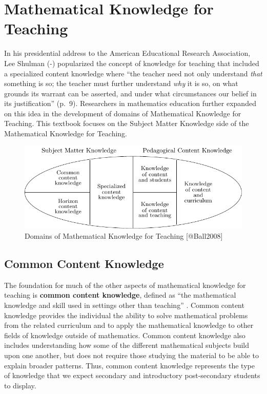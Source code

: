 \documentclass[
]{book}
\theoremstyle{definition}
\theoremstyle{definition}
\theoremstyle{definition}
\theoremstyle{definition}
\theoremstyle{remark}
\begin{document}
\newpage

\hypertarget{MKT}{%
\section{Mathematical Knowledge for Teaching}\label{MKT}}

In his presidential address to the American Educational Research Association, Lee Shulman (-\citet{shulman1986}) popularized the concept of knowledge for teaching that included a specialized content knowledge where ``the teacher need not only understand \emph{that} something is so; the teacher must further understand \emph{why} it is so, on what grounds its warrant can be asserted, and under what circumstances our belief in its justification'' (p.~9). Researchers in mathematics education further expanded on this idea in the development of domains of Mathematical Knowledge for Teaching. This textbook focuses on the Subject Matter Knowledge side of the Mathematical Knowledge for Teaching.

\begin{figure}

{\centering \includegraphics[width=1\linewidth]{tikz/ballegg1} 

}

\caption{Domains of Mathematical Knowledge for Teaching [@Ball2008]}\label{fig:unnamed-chunk-3}
\end{figure}

\hypertarget{common-content-knowledge}{%
\subsection{Common Content Knowledge}\label{common-content-knowledge}}

The foundation for much of the other aspects of mathematical knowledge for teaching is \textbf{common content knowledge}, defined as ``the mathematical knowledge and skill used in settings other than teaching'' \citep[p.~399]{Ball2008}. Common content knowledge provides the individual the ability to solve mathematical problems from the related curriculum and to apply the mathematical knowledge to other fields of knowledge outside of mathematics. Common content knowledge also includes understanding how some of the different mathematical subjects build upon one another, but does not require those studying the material to be able to explain broader patterns. Thus, common content knowledge represents the type of knowledge that we expect secondary and introductory post-secondary students to display.
\end{document}
